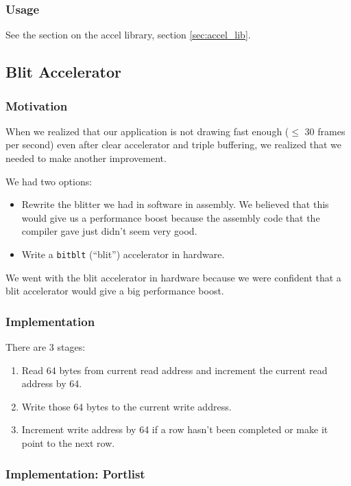 \documentclass[10pt]{article}
\begin{document}
\subsubsection{Usage}

See the section on the accel library, section \ref{sec:accel_lib}.

\subsection{Blit Accelerator}

\subsubsection{Motivation}

When we realized that our application is not drawing fast enough ($\le$ 30
frames per second) even after clear accelerator and triple buffering, we
realized that we needed to make another improvement.

We had two options:
\begin{itemize}
\item{Rewrite the blitter we had in software in assembly. We believed that
this would give us a performance boost because the assembly code that the
compiler gave just didn't seem very good.}
\item{Write a \texttt{bitblt} (``blit'') accelerator in hardware.}
\end{itemize}

We went with the blit accelerator in hardware because we were confident that
a blit accelerator would give a big performance boost.

\subsubsection{Implementation}

There are 3 stages:
\begin{enumerate}
\item{Read 64 bytes from current read address and increment the current read
address by 64.}
\item{Write those 64 bytes to the current write address.}
\item{Increment write address by 64 if a row hasn't been completed or make
it point to the next row.}
\end{enumerate}

\subsubsection{Implementation: Portlist}
\end{document}
